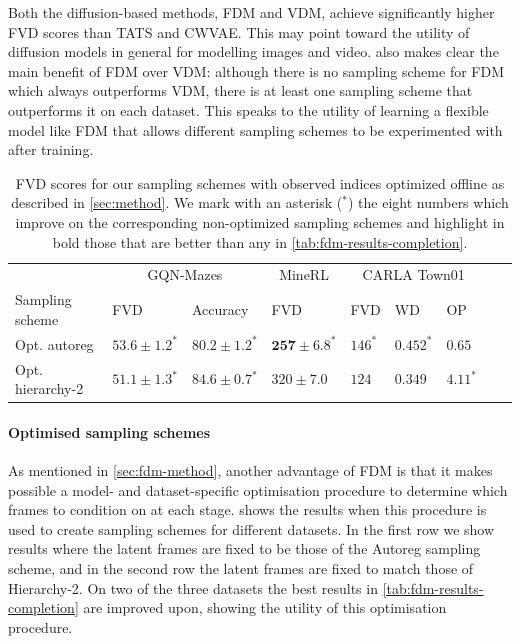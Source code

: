 Both the diffusion-based methods, FDM and VDM, achieve significantly higher FVD scores than TATS and CWVAE. This may point toward the utility of diffusion models in general for modelling images and video.  also makes clear the main benefit of FDM over VDM: although there is no sampling scheme for FDM which always outperforms VDM, there is at least one sampling scheme that outperforms it on each dataset. This speaks to the utility of learning a flexible model like FDM that allows different sampling schemes to be experimented with after training.

\begin{table} %
  \small
  \caption{FVD scores for our sampling schemes with observed indices optimized offline as described in \cref{sec:method}.  We mark with an asterisk ($^*$) the eight numbers which improve on the corresponding non-optimized sampling schemes and highlight in bold those that are better than any in \cref{tab:fdm-results-completion}.}
  \vspace{2mm}
  \label{tab:fdm-optimized}
  \centering
  \begin{tabular}{lllllllll}
    \toprule
     & \multicolumn{2}{c}{GQN-Mazes}  & \multicolumn{1}{c}{MineRL}  & \multicolumn{3}{c}{CARLA Town01} \\
    \cmidrule(r){2-3} \cmidrule(r){4-4} \cmidrule(r){5-7}
    Sampling scheme       & FVD     & Accuracy    &    FVD & FVD & WD & OP \\
    \midrule
    Opt. autoreg        & $53.6 \pm 1.2^*$            & $80.2 \pm 1.2^*$            & $\mathbf{257 \pm 6.8}^*$    &   $146^*$ & $0.452^*$ & $0.65$   \\
    Opt. hierarchy-2   & $\mathbf{51.1 \pm 1.3}^*$    & $\mathbf{84.6 \pm 0.7}^*$   & $320 \pm 7.0$    &   $124$ & $0.349$ & $4.11^*$   \\
    \bottomrule
  \end{tabular}
\end{table}

\paragraph{Optimised sampling schemes}
As mentioned in \cref{sec:fdm-method}, another advantage of FDM is that it makes possible a model- and dataset-specific optimisation procedure to determine which frames to condition on at each stage.  shows the results when this procedure is used to create sampling schemes for different datasets. In the first row we show results where the latent frames are fixed to be those of the Autoreg sampling scheme, and in the second row the latent frames are fixed to match those of Hierarchy-2. On two of the three datasets the best results in \cref{tab:fdm-results-completion} are improved upon, showing the utility of this optimisation procedure.

